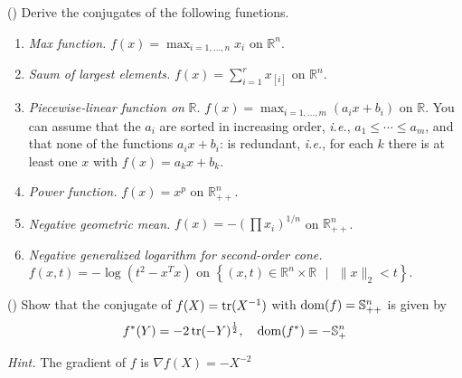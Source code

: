 \myline

\todo

\begin{problem}[3.36]
    (\todo)
    Derive the conjugates of the following funetions.
    \begin{enumerate}
        \item \textit{Max function.} $f(x) = \max_{i = 1,\dots,n}x_i$ on $\mathbb{R}^n$.
        \item \textit{Saum of largest elements.} $f(x) = \sum_{i = 1}^r x_{[i]}$ on $\mathbb{R}^n$.
        \item \textit{Piecewise-linear function on} $\mathbb{R}$. $f(x) = \max_{i = 1, \dots, m}(a_ix + b_i)$ on $\mathbb{R}$. You can assume that the $a_i$ are sorted in increasing order, \textit{i.e.}, $a_1 \le \cdots \le a_m$, and that none of the functions $a_ix + b_i$: is redundant, \textit{i.e.}, for each $k$ there is at least one $x$ with $f(x) = a_kx + b_k$.
        \item \textit{Power function.} $f(x) = x^p$ on $\mathbb{R}_{++}^n$.
        \item \textit{Negative geometric mean.} $f(x) = -\left(\prod x_i\right)^{1 / n}$ on $\mathbb{R}_{++}^n$.
        \item \textit{Negative generalized logarithm for second-order cone.} $f(x, t) = -\log(t^2 - x^Tx)$ on $\left\{(x, t) \in \mathbb{R}^n\times \mathbb{R}\text{\ } |\text{\ } \|x\|_2 < t\right\}$.
    \end{enumerate}

    \Answer
\end{problem}

\begin{problem}[3.37]
    (\todo)
    Show that the conjugate of $f(X) = \operatorname{tr}(X^{-1})$ with $\operatorname{dom}(f) = \mathbb{S}^n_{++}$ is given by\[f^*(Y) = -2\operatorname{tr}(-Y)^{\frac{1}{2}}, \quad \operatorname{dom}(f^*) = -\mathbb{S}_+^n\]

    \textit{Hint.} The gradient of $f$ is $\nabla f(X) = -X^{-2}$
\end{problem}

